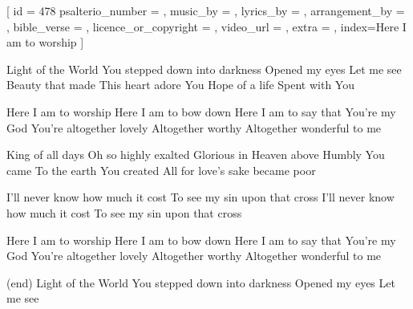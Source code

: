 
[
        id = {478}
	psalterio_number = {},
	music_by = {},    
	lyrics_by = {},
	arrangement_by = {},
	bible_verse  = {},
	licence_or_copyright = {},
	video_url = {},
	extra = {},
	index={Here I am to worship}
]


\repchoruses


\beginverse
Light of the World
You stepped down into darkness
Opened my eyes
Let me see
Beauty that made
This heart adore You
Hope of a life
Spent with You
\endverse

\beginchorus
Here I am to worship
Here I am to bow down
Here I am to say that You're my God
You're altogether lovely
Altogether worthy
Altogether wonderful to me
\endchorus

\beginverse
King of all days
Oh so highly exalted
Glorious in Heaven above
Humbly You came
To the earth You created
All for love's sake became poor
\endverse                         

\beginverse
I'll never know how much it cost
To see my sin upon that cross
I'll never know how much it cost
To see my sin upon that cross \linebreak
\endverse   

\beginchorus
Here I am to worship
Here I am to bow down
Here I am to say that You're my God
You're altogether lovely
Altogether worthy
Altogether wonderful to me
\endchorus


\beginverse
(end)
Light of the World
You stepped down into darkness
Opened my eyes
Let me see
\endverse   


\norepchoruses

\endsong
